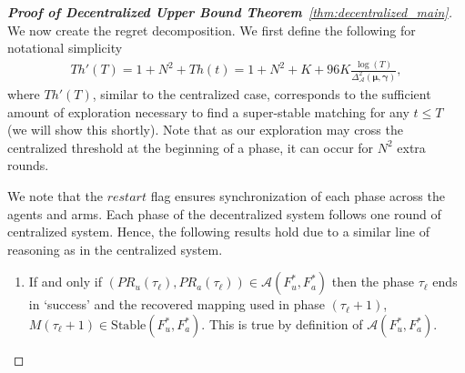 \documentclass{article}
\begin{document}
\begin{proof}[\textbf{Proof of Decentralized Upper Bound Theorem}~\ref{thm:decentralized_main}]
We now create the regret decomposition. We first define the following for notational simplicity
\begin{align*}
Th'(T) = 1 +  N^2 + Th(t) = 1 + N^2 + K + 96 K \frac{\log(T)}{\Delta^2_{\mathcal{A}}(\boldsymbol{\mu}, \boldsymbol{\gamma})}, 
\end{align*}
where $Th'(T)$, similar to the centralized case, corresponds to the sufficient amount of exploration necessary to find a super-stable matching for any $t \leq T$ (we will show this shortly). Note that as our exploration may cross the centralized threshold at the beginning of a phase, it can occur for $N^2$ extra rounds.

We note that the $restart$ flag ensures synchronization of each phase across the agents and arms. Each phase of the decentralized system follows one round of centralized system.  Hence, the following results hold due to a similar line of reasoning as in the centralized system.
\begin{enumerate}[leftmargin=*]
\item If and only if $(PR_{u}(\tau_{\ell}), PR_{a}(\tau_{\ell})) \in \mathcal{A}(F^*_u, F^*_a)$ then the phase $\tau_{\ell}$ ends in `success' and the recovered mapping used in phase $(\tau_{\ell} + 1)$, $M(\tau_{\ell} + 1) \in \mathrm{Stable}(F_u^*, F_a^*)$. This is true by definition of $\mathcal{A}(F^*_u, F^*_a)$.  
\end{enumerate}


\end{proof}
\end{document}
